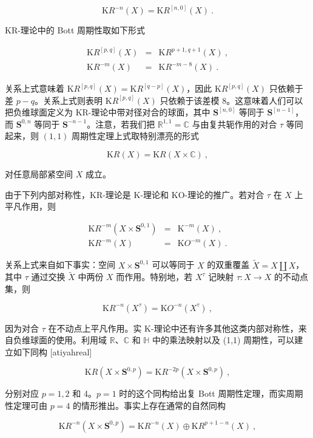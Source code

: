 \documentclass[11pt,a4paper]{ctexart}
\begin{document}
\[{\mathrm KR}^{-n}(X)={\mathrm KR}^[n,0](X)\ .\]

KR-理论中的 Bott 周期性取如下形式

\[\begin{matrix}
{\mathrm KR}^[p,q](X)&=&{\mathrm KR}^{p+1,q+1}(X)\ ,\\
{\mathrm KR}^{-m}(X)&=&{\mathrm KR}^{-m-8}(X)\ .
\end{matrix}\]

关系上式意味着 \({\mathrm KR}^[p,q](X)={\mathrm KR}^[q-p](X)\)，因此 \({\mathrm KR}^[p,q](X)\) 只依赖于差 \(p-q\)。关系上式则表明 \({\mathrm KR}^[p,q](X)\) 只依赖于该差模 8。这意味着人们可以把负维球面定义为 KR-理论中带对径对合的球面，其中 \({\mathbf S}^[n,0]\) 等同于 \({\mathbf S}^[n-1]\)，而 \({\mathbf S}^{0,n}\) 等同于 \({\mathbf S}^{-n-1}\)。注意，若我们把 \({\mathbb{R}}^{1,1}={\mathbb{C}}\) 与由复共轭作用的对合 \(\tau\) 等同起来，则 \((1,1)\) 周期性定理上式取特别漂亮的形式

\[{\mathrm KR}(X)={\mathrm KR}(X\times{\mathbb{C}})\ ,\]

对任意局部紧空间 \(X\) 成立。

由于下列内部对称性，KR-理论是 K-理论和 KO-理论的推广。若对合 \(\tau\) 在 \(X\) 上平凡作用，则

\[\begin{matrix}
{\mathrm KR}^{-m}(X\times {\mathbf S}^{0,1})&=&{\mathrm K}^{-m}(X)\ ,\\
{\mathrm KR}^{-m}(X)&=&{\mathrm KO}^{-m}(X)\ .
\end{matrix}\]

关系上式来自如下事实：空间 \(X\times {\mathbf S}^{0,1}\) 可以等同于 \(X\) 的双重覆盖 \(\tilde{X}=X\amalg X\)，其中 \(\tau\) 通过交换 \(\tilde{X}\) 中两份 \(X\) 而作用。特别地，若 \(X^{\tau}\) 记映射 \(\tau:X\rightarrow X\) 的不动点集，则

\[{\mathrm KR}^{-n}(X^{\tau})={\mathrm KO}^{-n}(X^{\tau})\ ,\]

因为对合 \(\tau\) 在不动点上平凡作用。实 K-理论中还有许多其他这类内部对称性，来自负维球面的使用。利用域 \({\mathbb{R}}\)、\({\mathbb{C}}\) 和 \({\mathbb{H}}\) 中的乘法映射以及 (1,1) 周期性，可以建立如下同构 [atiyahreal]

\[{\mathrm KR}(X\times {\mathbf S}^{0,p})=
{\mathrm KR}^{-2p}(X\times{\mathbf S}^{0,p})\ ,\]

分别对应 \(p=1,2\) 和 4。\(p=1\) 时的这个同构给出复 Bott 周期性定理，而实周期性定理可由 \(p=4\) 的情形推出。事实上存在通常的自然同构

\[{\mathrm KR}^{-n}(X\times{\mathbf S}^{0,p})=
{\mathrm KR}^{-n}(X)\oplus{\mathrm KR}^{p+1-n}(X)\ ,\]
\end{document}
